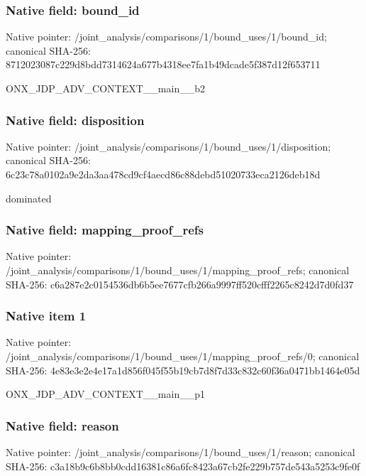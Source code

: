 \documentclass[10pt,a4paper]{article}
\begin{document}
\subsubsection{Native field: bound\_\allowbreak{}id}
Native pointer: /joint\_\allowbreak{}analysis/comparisons/1/bound\_\allowbreak{}uses/1/bound\_\allowbreak{}id; canonical SHA-256: 8712023087c229d8bdd7314624a677b4318ee7fa1b49dcade5f387d12f653711

\begingroup\raggedright\sloppy ONX\_\allowbreak{}JDP\_\allowbreak{}ADV\_\allowbreak{}CONTEXT\_\allowbreak{}\_\allowbreak{}main\_\allowbreak{}\_\allowbreak{}b2\par\endgroup

\subsubsection{Native field: disposition}
Native pointer: /joint\_\allowbreak{}analysis/comparisons/1/bound\_\allowbreak{}uses/1/disposition; canonical SHA-256: 6c23c78a0102a9e2da3aa478cd9cf4aecd86c88debd51020733eca2126deb18d

\begingroup\raggedright\sloppy dominated\par\endgroup

\subsubsection{Native field: mapping\_\allowbreak{}proof\_\allowbreak{}refs}
Native pointer: /joint\_\allowbreak{}analysis/comparisons/1/bound\_\allowbreak{}uses/1/mapping\_\allowbreak{}proof\_\allowbreak{}refs; canonical SHA-256: c6a287e2c0154536db6b5ee7677cfb266a9997ff520cfff2265c8242d7d0fd37

\subsubsection{Native item 1}
Native pointer: /joint\_\allowbreak{}analysis/comparisons/1/bound\_\allowbreak{}uses/1/mapping\_\allowbreak{}proof\_\allowbreak{}refs/0; canonical SHA-256: 4e83e3e2e4e17a1d856f045f55b19cb7d8f7d33c832c60f36a0471bb1464e05d

\begingroup\raggedright\sloppy ONX\_\allowbreak{}JDP\_\allowbreak{}ADV\_\allowbreak{}CONTEXT\_\allowbreak{}\_\allowbreak{}main\_\allowbreak{}\_\allowbreak{}p1\par\endgroup

\subsubsection{Native field: reason}
Native pointer: /joint\_\allowbreak{}analysis/comparisons/1/bound\_\allowbreak{}uses/1/reason; canonical SHA-256: c3a18b9c6b8bb0cdd16381c86a6fc8423a67cb2fe229b757de543a5253c9fe0f
\end{document}
